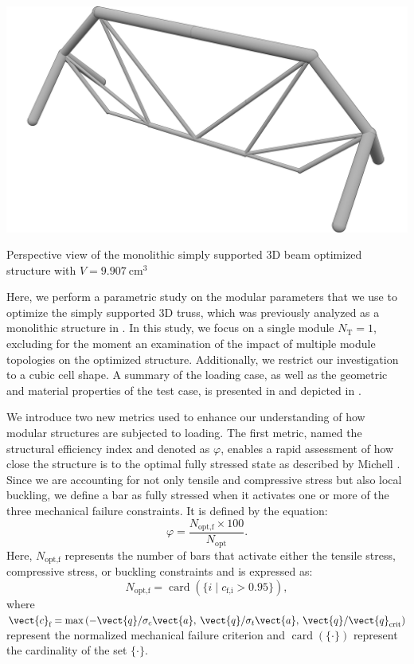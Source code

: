 \begin{marginfigure}
    \centering
    \includegraphics[width=\linewidth]{figures/04_TTO_improvements/16_supported_3D_sol/04_Topology_NLP_iso-min.png}
    \caption{Perspective view of the monolithic simply supported 3D beam optimized structure with $V=\qty{9.907}{\centi\meter^3}$}
    \label{fig:05}
\end{marginfigure}
Here, we perform a parametric study on the modular parameters that we use to optimize the simply supported 3D truss, which was previously analyzed as a monolithic structure in . In this study, we focus on a single module $N_\text{T} = 1$, excluding for the moment an examination of the impact of multiple module topologies on the optimized structure. Additionally, we restrict our investigation to a cubic cell shape. A summary of the loading case, as well as the geometric and material properties of the test case, is presented in  and depicted in .

We introduce two new metrics used to enhance our understanding of how modular structures are subjected to loading. The first metric, named the structural efficiency index and denoted as $\varphi$, enables a rapid assessment of how close the structure is to the optimal fully stressed state as described by Michell . Since we are accounting for not only tensile and compressive stress but also local buckling, we define a bar as fully stressed when it activates one or more of the three mechanical failure constraints. It is defined by the equation:
\begin{equation}
    \varphi = \frac{N_\text{opt,f}\times100}{N_\text{opt}}.
\end{equation}
Here, $N_\text{opt,f}$ represents the number of bars that activate either the tensile stress, compressive stress, or buckling constraints and is expressed as:
\begin{equation}
    N_\text{opt,f} = \operatorname{card}(\{i\;|\;c_\text{f,i} > 0.95\}),
\end{equation}
where $\vect{c}_\text{f}=\max{\left(-\vect{q} /\sigma_c \vect{a},\:\vect{q} /\sigma_t \vect{a},\:\vect{q}/\vect{q}_{\text{crit}}\right)}$ represent the normalized mechanical failure criterion and $\operatorname{card}(\{\cdot\})$ represent the cardinality of the set $\{\cdot\}$.


